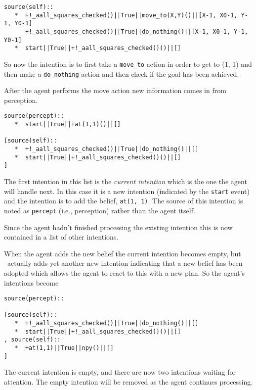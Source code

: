 \begin{verbatim}
source(self):: 
   *  +!_aall_squares_checked()||True||move_to(X,Y)()||[X-1, X0-1, Y-1, Y0-1]
      +!_aall_squares_checked()||True||do_nothing()||[X-1, X0-1, Y-1, Y0-1]
   *  start||True||+!_aall_squares_checked()()||[]
\end{verbatim}
So now the intention is to first take a \texttt{move\_to} action in order to get to (1, 1) and then make a \texttt{do\_nothing} action and then check if the goal has been achieved.

After the agent performs the move action new information comes in from perception.

\begin{verbatim}
source(percept):: 
   *  start||True||+at(1,1)()||[]

[source(self):: 
   *  +!_aall_squares_checked()||True||do_nothing()||[]
   *  start||True||+!_aall_squares_checked()()||[]
] 
\end{verbatim}
The first intention in this list is the \emph{current intention} which is the one the agent will handle next.  In this case it is a new intention (indicated by the \texttt{start} event) and the intention is to add the belief, \texttt{at(1, 1)}.  The source of this intention is noted as \texttt{percept} (i.e., perception) rather than the agent itself.

Since the agent hadn't finished processing the existing intention this is now contained in a list of other intentions.

When the agent adds the new belief the current intention becomes empty, but \gwendolen\ actually adds yet another new intention indicating that a new belief has been adopted which allows the agent to react to this with a new plan.  So the agent's intentions become
\begin{verbatim}
source(percept):: 

[source(self):: 
   *  +!_aall_squares_checked()||True||do_nothing()||[]
   *  start||True||+!_aall_squares_checked()()||[]
, source(self):: 
   *  +at(1,1)||True||npy()||[]
] 
\end{verbatim}
The current intention is empty, and there are now two intentions waiting for attention.  The empty intention will be removed as the agent continues processing.

